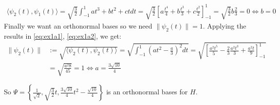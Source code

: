 \documentclass{article}
\begin{document}
\begin{enumerate}[label=(\roman*)]
  \begin{align}
    \langle \psi_2(t),\psi_1(t)\rangle = \sqrt{\frac{3}{2}}\int_{-1}^1  at^3 + bt^2 + ct dt = \sqrt{\frac{3}{2}} \left[ a\frac{t^4}{4} + b\frac{t^3}{3} + c\frac{t^2}{2} \right]_{-1}^1=\sqrt{\frac{3}{2}}b \frac{2}{3}= 0 \Longleftrightarrow b=0
    \label{eq:ex1a2}
 \end{align}
 Finally we want an orthonormal bases so we need $\|\psi_2(t)\|=1$. Applying the results in \eqref{eq:ex1a1}, \eqref{eq:ex1a2}, we get:
 \begin{align}
     \|\psi_2(t)\|
 &:= \sqrt{\langle \psi_2(t),\psi_2(t)\rangle} = \sqrt{\int_{-1}^1 \left( a t^2 -\frac{a}{3}\right)^2 dt} = \sqrt{\left[ \frac{a^2t^5}{5} - \frac{2}{3}\frac{a^2t^3}{3} + \frac{a ^2 t}{9} \right]_{-1}^1}\\
 &=\sqrt{ \frac{a^2 8}{45}} = 1 \Longleftrightarrow a=\frac{3\sqrt{10}}{4} 
 \end{align}
\end{enumerate}

So $\Psi = \left\lbrace\frac{1}{\sqrt{2}}, \sqrt{\frac{3}{2}}t, \frac{3\sqrt{10}}{4}  t^2- \frac{\sqrt{10}}{4}\right\rbrace$ is an orthonormal bases for $H$.
\end{document}
